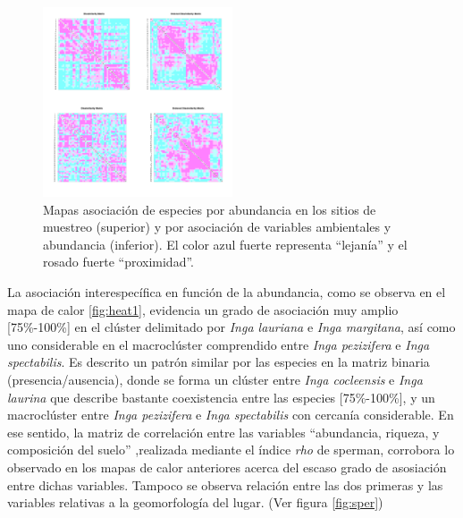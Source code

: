 \documentclass[11pt,]{article}
\begin{document}
\begin{figure}
\centering
\includegraphics[width=0.50000\textwidth]{Análisis/Imágenes manuscrito/Heat_maps_Q.png}
\caption{Mapas asociación de especies por abundancia en los sitios de
muestreo (superior) y por asociación de variables ambientales y
abundancia (inferior). El color azul fuerte representa ``lejanía'' y el
rosado fuerte ``proximidad''.\label{fig:heat}}
\end{figure}

La asociación interespecífica en función de la abundancia, como se
observa en el mapa de calor \ref{fig:heat1}, evidencia un grado de
asociación muy amplio {[}75\%-100\%{]} en el clúster delimitado por
\emph{Inga lauriana} e \emph{Inga margitana}, así como uno considerable
en el macroclúster comprendido entre \emph{Inga pezizifera} e \emph{Inga
spectabilis}. Es descrito un patrón similar por las especies en la
matriz binaria (presencia/ausencia), donde se forma un clúster entre
\emph{Inga cocleensis} e \emph{Inga laurina} que describe bastante
coexistencia entre las especies {[}75\%-100\%{]}, y un macroclúster
entre \emph{Inga pezizifera} e \emph{Inga spectabilis} con cercanía
considerable. En ese sentido, la matriz de correlación entre las
variables ``abundancia, riqueza, y composición del suelo'' ,realizada
mediante el índice \emph{rho} de sperman, corrobora lo observado en los
mapas de calor anteriores acerca del escaso grado de asosiación entre
dichas variables. Tampoco se observa relación entre las dos primeras y
las variables relativas a la geomorfología del lugar. (Ver figura
\ref{fig:sper})
\end{document}
